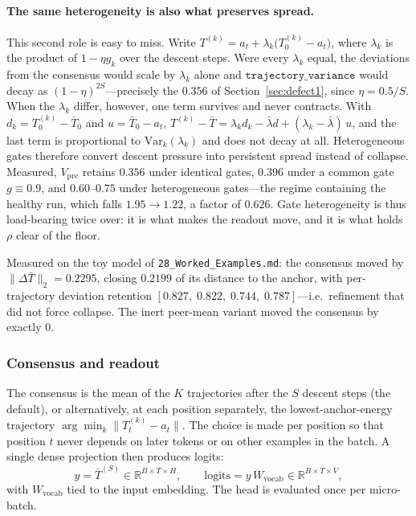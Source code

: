\documentclass[11pt,a4paper]{article}
\newcommand{\etadim}{\eta}
\newcommand{\rhodim}{\rho}
\theoremstyle{plain}
\theoremstyle{definition}
\theoremstyle{remark}
\begin{document}
\paragraph{The same heterogeneity is also what preserves spread.}
This second role is easy to miss. Write $T^{(k)} = a_t + \lambda_k\bigl(T^{(k)}_0 - a_t\bigr)$,
where $\lambda_k$ is the product of $1-\etadim g_k$ over the descent steps.
Were every $\lambda_k$ equal, the deviations from the consensus would scale by
$\lambda_k$ alone and $\texttt{trajectory\_variance}$ would decay as
$(1-\etadim)^{2S}$---precisely the $0.356$ of
Section~\ref{sec:defect1}, since $\etadim = 0.5/S$. When the $\lambda_k$
differ, however, one term survives and never contracts. With
$d_k = T^{(k)}_0 - \bar T_0$ and $u = \bar T_0 - a_t$,
$T^{(k)} - \bar T = \lambda_k d_k - \bar\lambda d + (\lambda_k - \bar\lambda)\,u$,
and the last term is proportional to $\mathrm{Var}_k(\lambda_k)$ and does not
decay at all. Heterogeneous gates therefore convert descent pressure into
persistent spread instead of collapse. Measured, $V_{\mathrm{pre}}$ retains
$0.356$ under identical gates, $0.396$ under a common gate $g \equiv 0.9$, and
$0.60$--$0.75$ under heterogeneous gates---the regime containing the healthy
run, which falls $1.95 \to 1.22$, a factor of $0.626$. Gate heterogeneity is
thus load-bearing twice over: it is what makes the readout move, and it is what
holds $\rhodim$ clear of the floor.

\noindent
Measured on the toy model of \texttt{28\_Worked\_Examples.md}: the consensus
moved by $\|\Delta \bar T\|_2 = 0.2295$, closing $0.2199$ of its distance to
the anchor, with per-trajectory deviation retention
$[0.827,\; 0.822,\; 0.744,\; 0.787]$---i.e.\ refinement that did not force
collapse. The inert peer-mean variant moved the consensus by exactly $0$.

\subsubsection{Consensus and readout}

\noindent
The consensus is the mean of the $K$ trajectories after the $S$ descent
steps (the default), or alternatively, at each position separately, the
lowest-anchor-energy trajectory $\arg\min_k \lVert T^{(k)}_t - a_t \rVert$.
The choice is made per position so that position $t$ never depends on later
tokens or on other examples in the batch. A single dense projection then
produces logits:
\begin{equation}
  y = \bar T^{(S)} \in \mathbb{R}^{B \times T \times H},
  \qquad \mathrm{logits} = y\, W_{\mathrm{vocab}} \in \mathbb{R}^{B \times T \times V},
  \label{eq:l2-readout}
\end{equation}
with $W_{\mathrm{vocab}}$ tied to the input embedding. The head is evaluated
once per micro-batch.
\end{document}

